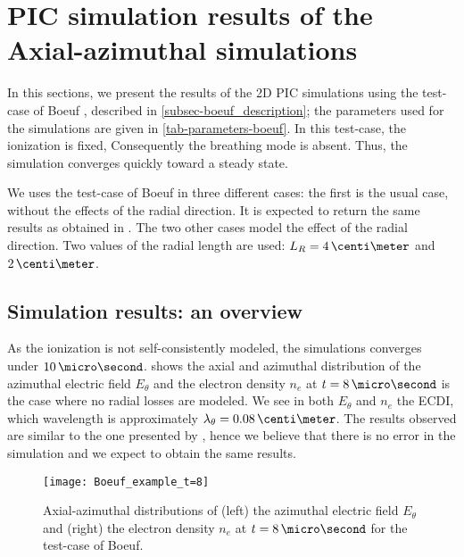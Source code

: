 
\section{PIC simulation results of the Axial-azimuthal simulations}
  \label{sec-Zthetaresults}
  In this sections, we present the results of the \ac{2D} \ac{PIC} simulations using the test-case of Boeuf \citep{boeuf2018}, described in \cref{subsec-boeuf_description}\string; the parameters used for the simulations are given in \vref{tab-parameters-boeuf}.
  In this test-case, the ionization is fixed, Consequently the breathing mode is absent.
  Thus, the simulation converges quickly toward a steady state.
  
  We uses the test-case of Boeuf in three different cases\string:
  the first is the usual case, without the effects of the radial direction.
  It is expected to return the same results as obtained in \citet{boeuf2018}.
  The two other cases model the effect of the radial direction.
  Two values of the radial length are used\string: $L_R=4\,\centi\meter$ and $2\,\centi\meter$.

  
  \subsection{Simulation results\string: an overview} \label{subsec-boeuf-overview}
  As the ionization is not self-consistently modeled, the simulations converges under $10\,\micro\second$.
   shows the axial and azimuthal distribution of the azimuthal electric field $E_{\theta}$ and the electron density $n_e$ at $t=8\,\micro\second$ is the case where no radial losses are modeled.
  We see in both $E_{\theta}$ and $n_e$ the \ac{ECDI}, which wavelength is approximately $\lambda_{\theta} = 0.08\,\centi\meter$.
  The results observed are similar to the one presented by \citet{boeuf2018}, hence we believe that there is no error in the simulation and we expect to obtain the same results.

  \begin{figure}[hbt]
    \centering
    \texttt{[image: Boeuf\_example\_t=8]}
    \caption{ Axial-azimuthal distributions of (left) the azimuthal electric field $E_{\theta}$ and (right) the electron density $n_e$ at $t=8\,\micro\second$ for the test-case of Boeuf. } 
    \label{fig-overview_boeuf_neEx}
  \end{figure}

